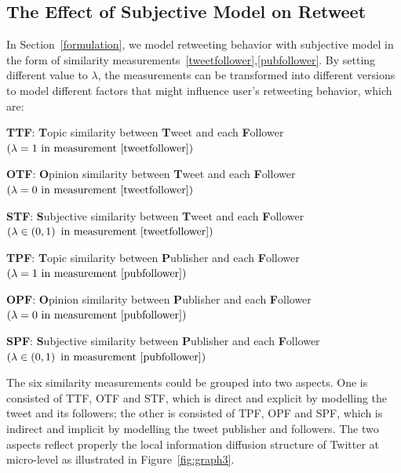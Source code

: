 \documentclass{acm_proc_article-sp}
\begin{document}
\subsection{The Effect of Subjective  Model on Retweet}
\label{influence}
In Section~\ref{formulation},  we model retweeting behavior with subjective model in the form of similarity measurements~\ref{tweetfollower},\ref{pubfollower}.
By setting different value to $ \lambda $, the measurements can be transformed into different versions to model different factors that might influence user's retweeting behavior, which are:
\begin{itemize*}
\item \textbf{TTF}: \textbf{T}opic similarity between \textbf{T}weet and each \textbf{F}ollower $ \left( \lambda =1  \text{ in measurement~\ref{tweetfollower}} \right) $ 
\item \textbf{OTF}: \textbf{O}pinion similarity between \textbf{T}weet and each \textbf{F}ollower $ \left( \lambda =0 \text{ in measurement~\ref{tweetfollower}} \right) $
\item \textbf{STF}: \textbf{S}ubjective similarity between \textbf{T}weet and each \textbf{F}ollower $ \left( \lambda \in \left( 0,1 \right)   \text{ in measurement~\ref{tweetfollower}} \right) $ 
\item \textbf{TPF}: \textbf{T}opic similarity between \textbf{P}ublisher and each \textbf{F}ollower $ \left( \lambda =1  \text{ in measurement~\ref{pubfollower}}  \right) $ 
\item \textbf{OPF}: \textbf{O}pinion similarity between \textbf{P}ublisher and each \textbf{F}ollower $ \left( \lambda =0 \text{ in measurement~\ref{pubfollower}} \right) $
\item \textbf{SPF}: \textbf{S}ubjective similarity between \textbf{P}ublisher and each \textbf{F}ollower $ \left( \lambda \in \left( 0,1 \right)   \text{ in measurement~\ref{pubfollower}} \right) $
\end{itemize*}
The six similarity measurements could be grouped into two aspects. 
One is consisted of TTF, OTF and STF, which is direct and explicit by modelling the tweet and its followers;
the other is consisted of TPF, OPF and SPF, which is indirect and implicit by modelling the tweet publisher and followers.
The two aspects reflect properly the local information diffusion structure of Twitter at micro-level as illustrated in Figure~\ref{fig:graph3}.
\end{document}
